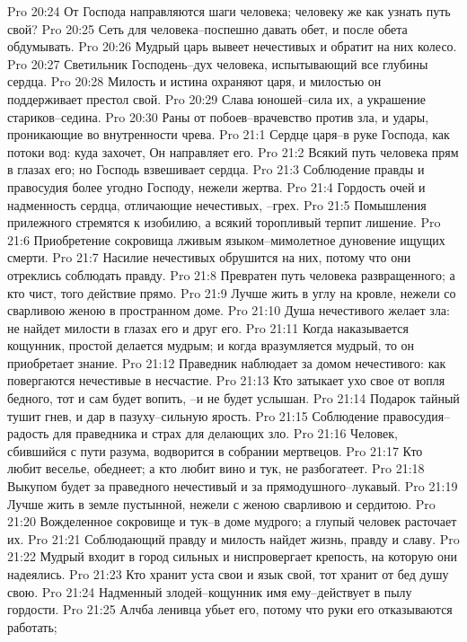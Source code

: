 Pro 20:24  От Господа направляются шаги человека; человеку же как узнать путь свой?
Pro 20:25  Сеть для человека--поспешно давать обет, и после обета обдумывать.
Pro 20:26  Мудрый царь вывеет нечестивых и обратит на них колесо.
Pro 20:27  Светильник Господень--дух человека, испытывающий все глубины сердца.
Pro 20:28  Милость и истина охраняют царя, и милостью он поддерживает престол свой.
Pro 20:29  Слава юношей--сила их, а украшение стариков--седина.
Pro 20:30  Раны от побоев--врачевство против зла, и удары, проникающие во внутренности чрева.
Pro 21:1  Сердце царя--в руке Господа, как потоки вод: куда захочет, Он направляет его.
Pro 21:2  Всякий путь человека прям в глазах его; но Господь взвешивает сердца.
Pro 21:3  Соблюдение правды и правосудия более угодно Господу, нежели жертва.
Pro 21:4  Гордость очей и надменность сердца, отличающие нечестивых, --грех.
Pro 21:5  Помышления прилежного стремятся к изобилию, а всякий торопливый терпит лишение.
Pro 21:6  Приобретение сокровища лживым языком--мимолетное дуновение ищущих смерти.
Pro 21:7  Насилие нечестивых обрушится на них, потому что они отреклись соблюдать правду.
Pro 21:8  Превратен путь человека развращенного; а кто чист, того действие прямо.
Pro 21:9  Лучше жить в углу на кровле, нежели со сварливою женою в пространном доме.
Pro 21:10  Душа нечестивого желает зла: не найдет милости в глазах его и друг его.
Pro 21:11  Когда наказывается кощунник, простой делается мудрым; и когда вразумляется мудрый, то он приобретает знание.
Pro 21:12  Праведник наблюдает за домом нечестивого: как повергаются нечестивые в несчастие.
Pro 21:13  Кто затыкает ухо свое от вопля бедного, тот и сам будет вопить, --и не будет услышан.
Pro 21:14  Подарок тайный тушит гнев, и дар в пазуху--сильную ярость.
Pro 21:15  Соблюдение правосудия--радость для праведника и страх для делающих зло.
Pro 21:16  Человек, сбившийся с пути разума, водворится в собрании мертвецов.
Pro 21:17  Кто любит веселье, обеднеет; а кто любит вино и тук, не разбогатеет.
Pro 21:18  Выкупом будет за праведного нечестивый и за прямодушного--лукавый.
Pro 21:19  Лучше жить в земле пустынной, нежели с женою сварливою и сердитою.
Pro 21:20  Вожделенное сокровище и тук--в доме мудрого; а глупый человек расточает их.
Pro 21:21  Соблюдающий правду и милость найдет жизнь, правду и славу.
Pro 21:22  Мудрый входит в город сильных и ниспровергает крепость, на которую они надеялись.
Pro 21:23  Кто хранит уста свои и язык свой, тот хранит от бед душу свою.
Pro 21:24  Надменный злодей--кощунник имя ему--действует в пылу гордости.
Pro 21:25  Алчба ленивца убьет его, потому что руки его отказываются работать;

